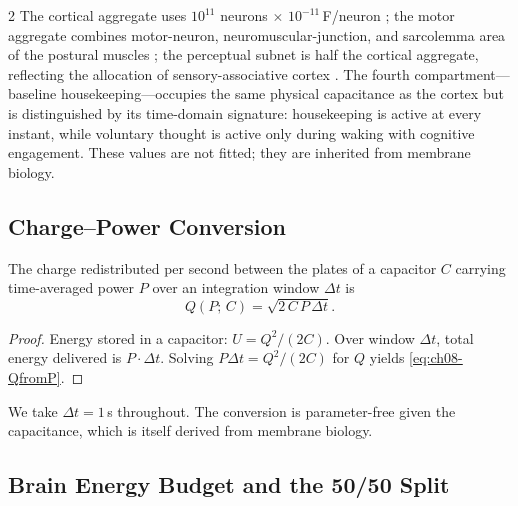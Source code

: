 \begin{multicols}{2}
The cortical aggregate uses $10^{11}$ neurons $\times$ $10^{-11}$\,F/neuron \citep{kandel2013}; the motor aggregate combines motor-neuron, neuromuscular-junction, and sarcolemma area of the postural muscles \citep{purves2018}; the perceptual subnet is half the cortical aggregate, reflecting the allocation of sensory-associative cortex \citep{zeki1993, koch2004}. The fourth compartment---baseline housekeeping---occupies the same physical capacitance as the cortex but is distinguished by its time-domain signature: housekeeping is active at every instant, while voluntary thought is active only during waking with cognitive engagement. These values are not fitted; they are inherited from membrane biology.

\subsection{Charge--Power Conversion}

\begin{theorem}
\label{thm:ch08-qfromp}
The charge redistributed per second between the plates of a capacitor $C$ carrying time-averaged power $P$ over an integration window $\Delta t$ is
\begin{equation}
Q(P;\, C) = \sqrt{2\, C\, P\, \Delta t}.
\label{eq:ch08-QfromP}
\end{equation}
\end{theorem}

\begin{proof}
Energy stored in a capacitor: $U = Q^2/(2C)$. Over window $\Delta t$, total energy delivered is $P \cdot \Delta t$. Solving $P\Delta t = Q^2/(2C)$ for $Q$ yields \eqref{eq:ch08-QfromP}.
\end{proof}

We take $\Delta t = 1$\,s throughout. The conversion is parameter-free given the capacitance, which is itself derived from membrane biology.

\subsection{Brain Energy Budget and the 50/50 Split}


\end{multicols}

